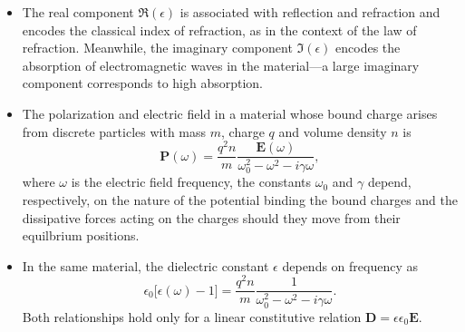 \documentclass[11pt, a4paper]{article}
\renewcommand{\vec}[1]{\bm{#1}} %
\newcommand{\E}{\vec{E}} %
\newcommand{\D}{\vec{D}}  %
\renewcommand{\P}{\vec{P}}  %
\newcommand{\ee}{\epsilon_{0}}  %
\begin{document}
\begin{itemize}
        \item The real component $ \Re(\epsilon) $ is associated with reflection and refraction and encodes the classical index of refraction, as in the context of the law of refraction. Meanwhile, the imaginary component $ \Im(\epsilon) $ encodes the absorption of electromagnetic waves in the material---a large imaginary component corresponds to high absorption. 

     \item The polarization and electric field in a material whose bound charge arises from discrete particles with mass $ m $, charge $ q $ and volume density $ n $ is
        \begin{equation*}
            \P(\omega) = \frac{q^{2}n}{m} \frac{\E(\omega)}{\omega_{0}^{2} - \omega^{2} - i \gamma \omega},
        \end{equation*}
        where $ \omega $ is the electric field frequency, the constants $ \omega_{0} $ and $ \gamma $ depend, respectively, on the nature of the potential binding the bound charges and the dissipative forces acting on the charges should they move from their equilbrium positions.

        \item In the same material, the dielectric constant $ \epsilon $ depends on frequency as
        \begin{equation*}
            \ee \big[ \epsilon(\omega) -1 \big] = \frac{q^{2}n}{m} \frac{1}{\omega_{0}^{2} - \omega^{2} - i\gamma\omega}. 
        \end{equation*}
        Both relationships hold only for a linear constitutive relation $ \D = \epsilon \epsilon_{0} \E $.
    
\end{itemize}
\end{document}
